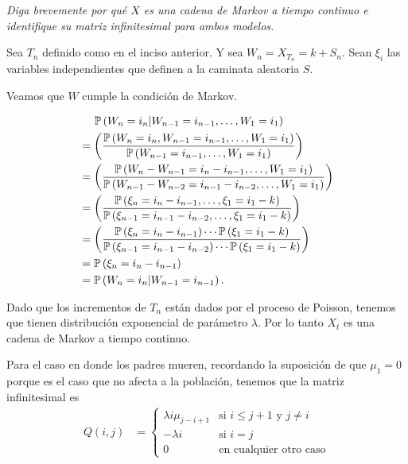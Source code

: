 \emph{
    Diga brevemente por qu\'e $X$ es una cadena de Markov a tiempo continuo e identifique 
    su matriz infinitesimal para ambos modelos.\pn
}
\afterstatement\pn

Sea $T_n$ definido como en el inciso anterior. Y sea $W_n = X_{T_n} = k + S_n$. Sean $\xi_i$ las
variables independientes que definen a la caminata aleatoria $S$.\pn

Veamos que $W$ cumple la condición de Markov.

\begin{align}
    &   \;\;\;\;\; \P\left( W_n = i_n | W_{n-1} = i_{n-1}, \dots, W_{1} = i_{1} \right)                                                                                                     \\
    &   =\left(\frac{\P\left( W_n = i_n , W_{n-1} = i_{n-1}, \dots, W_{1} = i_{1} \right)}{\P\left( W_{n-1} = i_{n-1}, \dots, W_{1} = i_{1} \right)}\right)                                              \\
    &   =\left(\frac{\P\left( W_n - W_{n-1} = i_n - i_{n-1}, \dots, W_{1} = i_{1} \right)}{\P\left( W_{n-1} - W_{n-2} = i_{n-1} - i_{n-2}, \dots, W_{1} = i_{1} \right)}\right)                          \\
    &   =\left(\frac{\P\left( \xi_n = i_n - i_{n-1}, \dots, \xi_{1} = i_{1} - k \right)}{\P\left( \xi_{n-1} = i_{n-1} - i_{n-2}, \dots, \xi_{1} = i_{1} - k \right)}\right)                              \\
    &   =\left(\frac{\P\left( \xi_n = i_n - i_{n-1}\right) \cdots \P\left(\xi_{1} = i_{1} - k \right)}{\P\left( \xi_{n-1} = i_{n-1} - i_{n-2}\right) \cdots \P\left(\xi_{1} = i_{1} - k \right)}\right)  \\
    &   =\P\left( \xi_n = i_n - i_{n-1}\right)                                                                                                                                              \\
    &   =\P\left( W_n = i_n | W_{n-1} = i_{n-1} \right).
\end{align}

Dado que los incrementos de $T_n$ están dados por el proceso de Poisson, tenemos que tienen distribución exponencial
de parámetro $\lambda$. Por lo tanto $X_t$ es una cadena de Markov a tiempo continuo.\pn

Para el caso en donde los padres mueren, recordando la suposición de que $\mu_1 = 0$ porque es el caso que no afecta a la población,
tenemos que la matriz infinitesimal es
\begin{align}
        Q(i,j)  &=
                \begin{cases}
                    \lambda i \mu_{j-i+1}   &    \text{si $i \leq j+1$ y $j \neq i$} \\
                    -\lambda i              &    \text{si $i = j$}                   \\
                    0                       &    \text{en cualquier otro caso}
                \end{cases}
\end{align}

